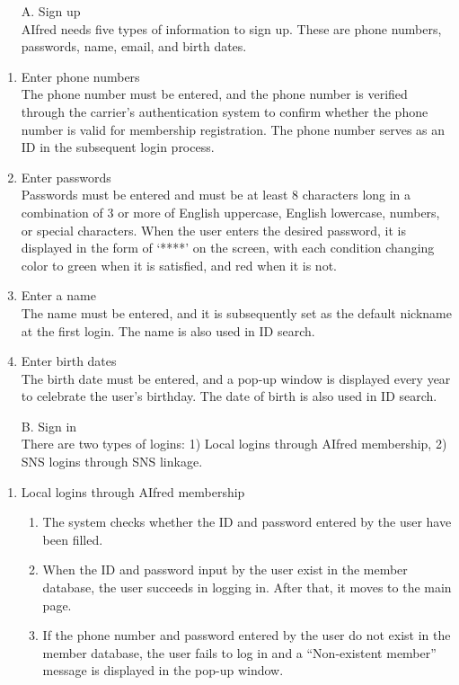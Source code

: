 \documentclass[conference]{IEEEtran}
\begin{document}
\begin{itemize}
    \item [A.] Sign up \\
    AIfred needs five types of information to sign up. These are phone numbers, passwords, name, email, and birth dates.
\end{itemize}
\begin{enumerate}
    \item Enter phone numbers \\
    The phone number must be entered, and the phone number is verified through the carrier’s authentication system to confirm whether the phone number is valid for membership registration. The phone number serves as an ID in the subsequent login process.

    \item Enter passwords \\
    Passwords must be entered and must be at least 8 characters long in a combination of 3 or more of English uppercase, English lowercase, numbers, or special characters. When the user enters the desired password, it is displayed in the form of ‘****’ on the screen, with each condition changing color to green when it is satisfied, and red when it is not.

    \item Enter a name \\
    The name must be entered, and it is subsequently set as the default nickname at the first login. The name is also used in ID search.

    \item Enter birth dates \\
    The birth date must be entered, and a pop-up window is displayed every year to celebrate the user's birthday. The date of birth is also used in ID search. \\
\end{enumerate}

\begin{itemize}
    \item [B.] Sign in \\
    There are two types of logins: 1) Local logins through AIfred membership, 2) SNS logins through SNS linkage.
\end{itemize}

\begin{enumerate}
    \item Local logins through AIfred membership
    \begin{enumerate}
        \item The system checks whether the ID and password entered by the user have been filled.
        \item When the ID and password input by the user exist in the member database, the user succeeds in logging in. After that, it moves to the main page.
        \item If the phone number and password entered by the user do not exist in the member database, the user fails to log in and a “Non-existent member” message is displayed in the pop-up window. \\
    \end{enumerate}
\end{enumerate}
\end{document}
